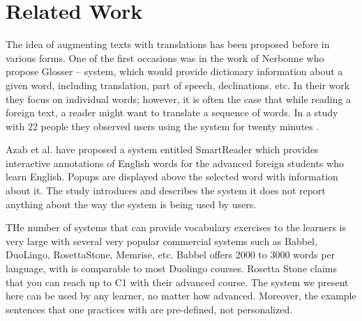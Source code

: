 
\section{Related Work}

The idea of augmenting texts with translations has been proposed before in various forms. One of the first occasions was in the work of Nerbonne \cite{Nerb99-Assistant} who propose Glosser -- system, which would provide dictionary information about a given word, including translation, part of speech, declinations. etc. In their work they focus on individual words; however, it is often the case that while reading a foreign text, a reader might want to translate a sequence of words. In a study with 22 people they observed users using the system for twenty minutes \cite{Dokter98-UserStudy}.

Azab et al. \cite{Azab13-nlp} have proposed a system entitled SmartReader which provides interactive annotations of English words for the advanced foreign students who learn English. Popups are displayed above the selected word with information about it. The study introduces and describes the system it does not report anything about the way the system is being used by users.

THe number of systems that can provide vocabulary exercises to the learners is very large with several very popular commercial systems such as Babbel, DuoLingo, RosettaStone, Memrise, etc. Babbel offers 2000 to 3000 words per language, with is comparable to most Duolingo courses. Rosetta Stone claims that you can reach up to C1 with their advanced course. The system we present here can be used by any learner, no matter how advanced. Moreover, the example sentences that one practices with are pre-defined, not personalized.




